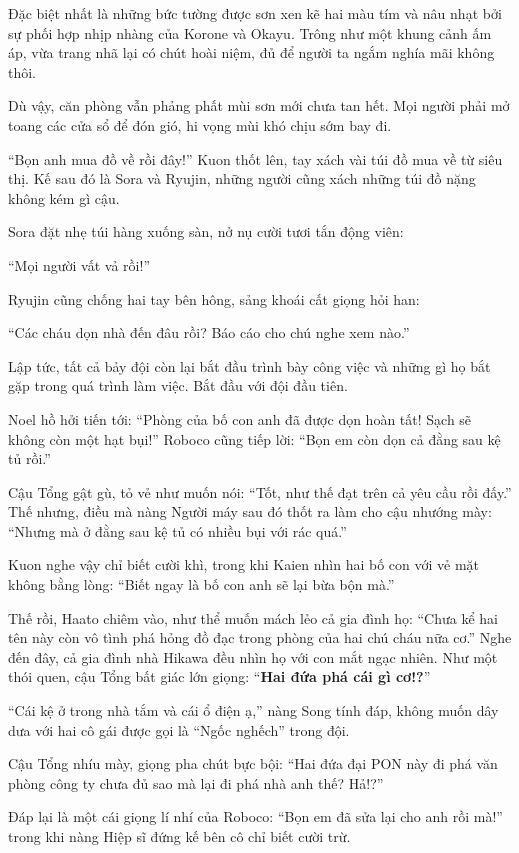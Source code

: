 \documentclass[../main.tex]{subfiles}
\begin{document}
Đặc biệt nhất là những bức tường được sơn xen kẽ hai màu tím và nâu nhạt bởi sự phối hợp nhịp nhàng của Korone và Okayu. Trông như một khung cảnh ấm áp, vừa trang nhã lại có chút hoài niệm, đủ để người ta ngắm nghía mãi không thôi.

Dù vậy, căn phòng vẫn phảng phất mùi sơn mới chưa tan hết. Mọi người phải mở toang các cửa sổ để đón gió, hi vọng mùi khó chịu sớm bay đi.

``Bọn anh mua đồ về rồi đây!'' Kuon thốt lên, tay xách vài túi đồ mua về từ siêu thị. Kế sau đó là Sora và Ryujin, những người cũng xách những túi đồ nặng không kém gì cậu.

Sora đặt nhẹ túi hàng xuống sàn, nở nụ cười tươi tắn động viên:

``Mọi người vất vả rồi!''

Ryujin cũng chống hai tay bên hông, sảng khoái cất giọng hỏi han:

``Các cháu dọn nhà đến đâu rồi? Báo cáo cho chú nghe xem nào.''

Lập tức, tất cả bảy đội còn lại bắt đầu trình bày công việc và những gì họ bắt gặp trong quá trình làm việc. Bắt đầu với đội đầu tiên.

Noel hồ hởi tiến tới: ``Phòng của bố con anh đã được dọn hoàn tất! Sạch sẽ không còn một hạt bụi!'' Roboco cũng tiếp lời: ``Bọn em còn dọn cả đằng sau kệ tủ rồi.''

Cậu Tổng gật gù, tỏ vẻ như muốn nói: ``Tốt, như thế đạt trên cả yêu cầu rồi đấy.'' Thế nhưng, điều mà nàng Người máy sau đó thốt ra làm cho cậu nhướng mày: ``Nhưng mà ở đằng sau kệ tủ có nhiều bụi với rác quá.''

Kuon nghe vậy chỉ biết cười khì, trong khi Kaien nhìn hai bố con với vẻ mặt không bằng lòng: ``Biết ngay là bố con anh sẽ lại bừa bộn mà.''

Thế rồi, Haato chiêm vào, như thể muốn mách lẻo cả gia đình họ: ``Chưa kể hai tên này còn vô tình phá hỏng đồ đạc trong phòng của hai chú cháu nữa cơ.'' Nghe đến đây, cả gia đình nhà Hikawa đều nhìn họ với con mắt ngạc nhiên. Như một thói quen, cậu Tổng bất giác lớn giọng: ``\textbf{Hai đứa phá cái gì cơ!?}''

``Cái kệ ở trong nhà tắm và cái ổ điện ạ,'' nàng Song tính đáp, không muốn dây dưa với hai cô gái được gọi là ``Ngốc nghếch'' trong đội.

Cậu Tổng nhíu mày, giọng pha chút bực bội: ``Hai đứa đại PON này đi phá văn phòng công ty chưa đủ sao mà lại đi phá nhà anh thế? Hả!?''

Đáp lại là một cái giọng lí nhí của Roboco: ``Bọn em đã sửa lại cho anh rồi mà!'' trong khi nàng Hiệp sĩ đứng kế bên cô chỉ biết cười trừ.
\end{document}
